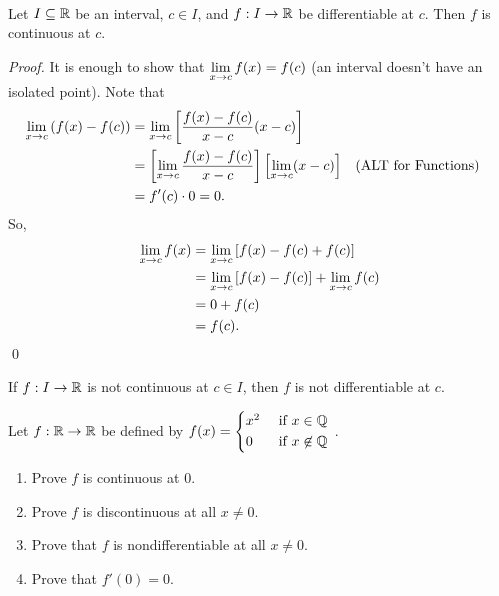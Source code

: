 \begin{theorem}  \leavevmode \\
    \label{thm5.2}
    Let $I \subseteq \mathbb{R}$ be an interval, $c \in I$, and $f:I \to \mathbb{R}$ be differentiable at $c$. Then $f$ is continuous at $c$.
\end{theorem}

\begin{proof}
    It is enough to show that $\lim \limits_{x \to c} f(x) = f(c)$ (an interval doesn't have an isolated point). Note that
    \begin{align*}
        \lim \limits_{x \to c}\left(f(x) - f(c)\right) &= \lim \limits_{x \to c}\left[\frac{f(x) - f(c)}{x - c}(x-c)\right] \\
        &= \left[\lim \limits_{x \to c} \frac{f(x) - f(c)}{x-c}\right]\left[\lim \limits_{x \to c}(x-c)\right] &&(\text{ALT for Functions}) \\
        &= f'(c) \cdot 0 = 0.
    \end{align*}
    So,
    \begin{align*}
        \lim \limits_{x \to c}f(x) &= \lim \limits_{x \to c}\left[f(x) - f(c) + f(c)\right] \\
        &= \lim \limits_{x \to c}\left[f(x) - f(c)\right] + \lim \limits_{x \to c}f(c) \\
        &= 0 + f(c) \\
        &= f(c).
    \end{align*}
    \qed
\end{proof}

\begin{corollary}
    If $f:I \to \mathbb{R}$ is not continuous at $c \in I$, then $f$ is not differentiable at $c$.
\end{corollary}

\begin{example}
    Let $f:\mathbb{R} \to \mathbb{R}$ be defined by $f(x) = \begin{cases*}
        x^2 &\text{ if $x\in \Q$} \\
        0 &\text{ if $x \not \in \Q$}
    \end{cases*}$.
    \begin{enumerate} [$(i)$]
        \item Prove $f$ is continuous at $0$.
        \item Prove $f$ is discontinuous at all $x \not = 0$.
        \item Prove that $f$ is nondifferentiable at all $x \not = 0$.
        \item Prove that $f'(0) =0$.
    \end{enumerate}
\end{example}

